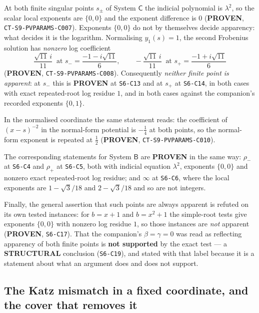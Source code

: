 At both finite singular points $s_\pm$ of System $\mathsf C$ the indicial
polynomial is $\lambda^2$, so the scalar local exponents are $\{0,0\}$ and the
exponent difference is $0$ (\textbf{PROVEN},
\texttt{CT-S9-PVPARAMS-C007}). Exponents $\{0,0\}$ do not by themselves decide
apparency: what decides it is the logarithm. Normalising $y_1(s)=1$, the second
Frobenius solution has \emph{nonzero} log coefficient
\begin{equation}\label{eq:logcoef}
  \frac{\sqrt{11}\,i}{11}\ \text{ at } s_-=\frac{-1-i\sqrt{11}}{6},
  \qquad
  -\frac{\sqrt{11}\,i}{11}\ \text{ at } s_+=\frac{-1+i\sqrt{11}}{6}
\end{equation}
(\textbf{PROVEN}, \texttt{CT-S9-PVPARAMS-C008}). Consequently \emph{neither
finite point is apparent}: at $s_-$ this is \textbf{PROVEN} at
\texttt{S6-C13} and at $s_+$ at \texttt{S6-C14}, in both cases with exact
repeated-root log residue $1$, and in both cases against the companion's
recorded exponents $\{0,1\}$.

In the normalised coordinate the same statement reads: the coefficient of
$(x-s)^{-2}$ in the normal-form potential is $-\tfrac14$ at both points, so the
normal-form exponent is repeated at $\tfrac12$ (\textbf{PROVEN},
\texttt{CT-S9-PVPARAMS-C010}).

The corresponding statements for System $\mathsf B$ are \textbf{PROVEN} in the
same way: $\rho_-$ at \texttt{S6-C4} and $\rho_+$ at \texttt{S6-C5}, both with
indicial equation $\lambda^2$, exponents $\{0,0\}$ and nonzero exact
repeated-root log residue; and $\infty$ at \texttt{S6-C6}, where the local
exponents are $1-\sqrt3/18$ and $2-\sqrt3/18$ and so are not integers.

Finally, the general assertion that such points are always apparent is refuted
on its own tested instances: for $b=x+1$ and $b=x^2+1$ the simple-root tests
give exponents $\{0,0\}$ with nonzero log residue $1$, so those instances are
\emph{not} apparent (\textbf{PROVEN}, \texttt{S6-C17}). That the companion's
$\beta=\gamma=0$ was read as reflecting apparency of both finite points is
\textbf{not supported} by the exact test --- a \textbf{STRUCTURAL} conclusion
(\texttt{S6-C19}), and stated with that label because it is a statement about
what an argument does and does not support.

\subsection{The Katz mismatch in a fixed coordinate, and the cover that
removes it}\label{ssec:cover}

